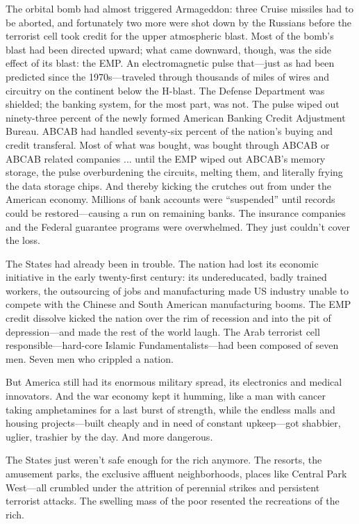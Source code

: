 The orbital bomb had almost triggered Armageddon: three Cruise missiles had to be aborted, and fortunately two more were shot down by the Russians before the terrorist cell took credit for the upper atmospheric blast. Most of the bomb's blast had been directed upward; what came downward, though, was the side effect of its blast: the EMP. An electromagnetic pulse that---just as had been predicted since the 1970s---traveled through thousands of miles of wires and circuitry on the continent below the H-blast. The Defense Department was shielded; the banking system, for the most part, was not. The pulse wiped out ninety-three percent of the newly formed American Banking Credit Adjustment Bureau. ABCAB had handled seventy-six percent of the nation's buying and credit transferal. Most of what was bought, was bought through ABCAB or ABCAB related companies ... until the EMP wiped out ABCAB's memory storage, the pulse overburdening the circuits, melting them, and literally frying the data storage chips. And thereby kicking the crutches out from under the American economy. Millions of bank accounts were ``suspended'' until records could be restored---causing a run on remaining banks. The insurance companies and the Federal guarantee programs were overwhelmed. They just couldn't cover the loss.

The States had already been in trouble. The nation had lost its economic initiative in the early twenty-first century: its undereducated, badly trained workers, the outsourcing of jobs and manufacturing made US industry unable to compete with the Chinese and South American manufacturing booms. The EMP credit dissolve kicked the nation over the rim of recession and into the pit of depression---and made the rest of the world laugh. The Arab terrorist cell responsible---hard-core Islamic Fundamentalists---had been composed of seven men. Seven men who crippled a nation.

But America still had its enormous military spread, its electronics and medical innovators. And the war economy kept it humming, like a man with cancer taking amphetamines for a last burst of strength, while the endless malls and housing projects---built cheaply and in need of constant upkeep---got shabbier, uglier, trashier by the day. And more dangerous.

The States just weren't safe enough for the rich anymore. The resorts, the amusement parks, the exclusive affluent neighborhoods, places like Central Park West---all crumbled under the attrition of perennial strikes and persistent terrorist attacks. The swelling mass of the poor resented the recreations of the rich.

